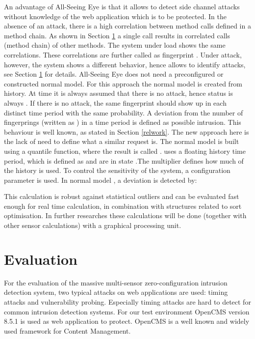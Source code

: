 \documentclass[conference]{IEEEtran}
\begin{document}
An advantage of All-Seeing Eye is that it allows to detect side channel attacks without knowledge of the web application which is to be protected. 
In the absence of an attack, there is  a high correlation between method calls defined in a method chain. As shown in Section \ref{evaluation} a single call results in correlated calls (method chain) of other methods.
 The system under load shows the same correlations. These correlations are further called as fingerprint . 
 Under attack, however, the system shows a different behavior, hence allows to identify attacks, see Section \ref{evaluation} for details.
All-Seeing Eye does not need a preconfigured or constructed normal model. For this approach the normal model is created from history.
At time  it is always assumed that there is no attack, hence status  is always . 
If there is no attack, the same fingerprint  should show up in each distinct time period  with the same probability.
A deviation from the number of fingerprings (written as ) in a time period  is defined as possible intrusion.
This behaviour is well known, as stated in Section \ref{relwork}. The new approach here is the lack of need to define what a similar request is.
The normal model is built using a quantile function, where the result is called  .
 uses a floating history time period, which is defined as  and  are in state .The multiplier  defines how much of the history is used. To control the sensitivity of the system, a configuration parameter  is used.
In normal model , a deviation is detected by:

This calculation is robust against statistical outliers and can be evaluated fast enough for real time calculation, in combination with structures related to sort optimisation. In further researches these calculations will be done (together with other sensor calculations) with a graphical processing unit.




\section{Evaluation}\label{evaluation}
For the evaluation of the massive multi-sensor zero-configuration intrusion detection system, two typical attacks on web applications are used: timing attacks and vulnerability probing. Especially timing attacks are hard to detect for common intrusion detection systems.
For our test environment OpenCMS version 8.5.1 \cite{opencms_2013} is used as web application to protect. OpenCMS is a well known and widely used framework for Content Management. 
\end{document}
